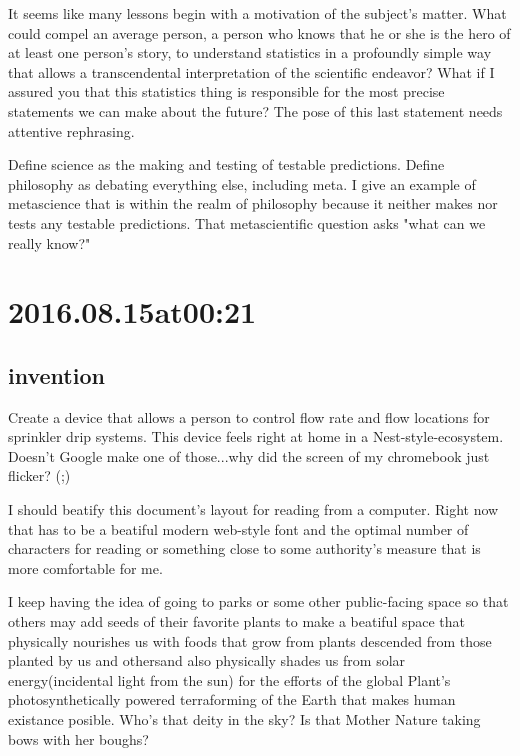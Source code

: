 \begin{enumerate}
\begin{enumerate}
It seems like many lessons begin with a motivation of the subject's matter. What could compel an average person, a person who knows that he or she is the hero of at least one person's story, to understand statistics in a profoundly simple way that allows a transcendental interpretation of the scientific endeavor? What if I assured you that this statistics thing is responsible for the most precise statements we can make about the future? The pose of this last statement needs attentive rephrasing.

Define science as the making and testing of testable predictions. Define philosophy as debating everything else, including meta. I give an example of metascience that is within the realm of philosophy because it neither makes nor tests any testable predictions. That metascientific question asks "what can we really know?"



\section*{ 2016.08.15at00:21 }
\subsection*{invention}
Create a device that allows a person to control flow rate and flow locations for sprinkler drip systems. This device feels right at home in a Nest-style-ecosystem. Doesn't Google make one of those...why did the screen of my chromebook just flicker? (;)


I should beatify this document's layout for reading from a computer. Right now that has to be a beatiful modern web-style font and the optimal number of characters for reading or something close to some authority's measure that is more comfortable for me. 

I keep having the idea of going to parks or some other public-facing space so that others may add seeds of their favorite plants to make a beatiful space that physically nourishes us with foods that grow from plants descended from those planted by us and othersand also physically shades us from solar energy(incidental light from the sun) for the efforts of the global Plant's photosynthetically powered terraforming of the Earth that makes human existance posible. Who's that deity in the sky? Is that Mother Nature taking bows with her boughs?


\end{enumerate}
\end{enumerate}
